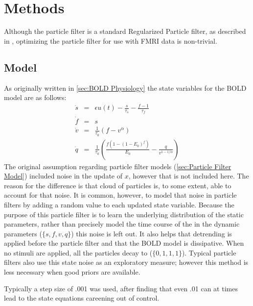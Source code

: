 \chapter{Methods}
\label{sec:Methods}
Although the particle filter  is a standard Regularized
Particle filter, as described in \cite{Arulampalam2002a}, optimizing the 
particle filter for use with FMRI data is non-trivial. 


\section{Model}
As originally written in \autoref{sec:BOLD Physiology} the state variables
for the BOLD model are as follows:
\begin{eqnarray}
\dot{s} &=& \epsilon u(t) - \frac{s}{\tau_s} - \frac{f - 1}{\tau_f} \\
\dot{f} &=& s\\
\dot{v} &=& \frac{1}{\tau_0}(f - v^\alpha)\\
\dot{q} &=& \frac{1}{\tau_0}(\frac{f(1-(1-E_0)^f)}{E_0} - \frac{q}{v^{1-1/\alpha}})
\end{eqnarray}
The original assumption regarding particle filter models (\autoref{sec:Particle Filter Model})
included noise in the update of $x$, however that is not included here.
The reason for the difference is that cloud of particles is, to some extent,
able to account for that noise. It is common, however, to model that noise
in particle filters by adding a random value to each updated state variable. 
Because the purpose of this particle filter is to learn the underlying distribution
of the static parameters, rather than precisely model the time course of the 
in the dynamic parameters ($\{s,f,v,q\}$) this noise is left out. It also helps
that detrending is applied before the particle filter and that the
BOLD model is dissipative. When no stimuli are applied, all the particles 
decay to ($\{0,1,1,1\}$). Typical particle filters 
also use this state noise as an exploratory measure; however this method is
less necessary when good priors are available.

Typically a step size of .001 was used, after finding that even .01 can
at times lead to the state equations careening out of control.



